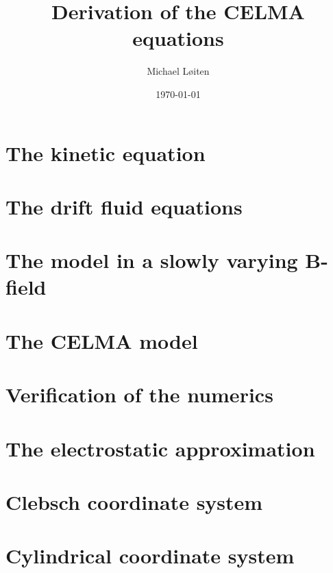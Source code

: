 \documentclass[12pt,a4paper,oneside,openright]{report} %
\title{\vspace{-8ex}Derivation of the CELMA equations\vspace{-1ex}}
\author{Michael L{\o}iten}
\date{\vspace{-2ex}\today}
\begin{document}
\maketitle

\chapter{The kinetic equation}

%
\chapter{The drift fluid equations}
\label{chap:drift-order}


\chapter{The model in a slowly varying B-field}


\chapter{The CELMA model}






%
%
\chapter{Verification of the numerics}
\label{app:verification}


\appendix

\chapter{The electrostatic approximation}
\label{app:elstat}


\chapter{Clebsch coordinate system}
\label{app:Clebsch}


\chapter{Cylindrical coordinate system}
\label{app:cylcoord}

\end{document}
